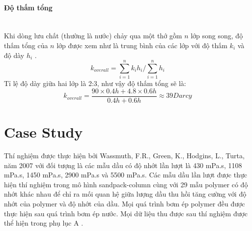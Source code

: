 \documentclass[12pt,a4paper]{article}
\newcommand{\subsubsubsection}[1]{\paragraph{#1}\mbox{}\\}
\begin{document}
	\subsubsubsection{Độ thấm tổng}
	Khi dòng lưu chất (thường là nước) chảy qua một thớ gồm $n$ lớp song song, độ thấm tổng của $n$ lớp được xem như là trung bình của các lớp với độ thấm $k_i$ và độ dày $h_i$ \cite{li2011study}.
		\begin{equation}
			k_{overall}=\sum_{i=1}^nk_ih_i/\sum_{i=1}^nh_i
		\end{equation}
	Tỉ lệ độ dày giữa hai lớp là 2:3, như vậy độ thấm tổng sẽ là:
		\begin{equation}
			k_{overall}=\frac{90\times0.4h+4.8\times0.6h}{0.4h+0.6h}\approx39 Darcy
		\end{equation}

\newpage
\section{Case Study}
	Thí nghiệm được thực hiện bởi Wassmuth, F.R., Green, K., Hodgins, L., Turta, năm 2007 \cite{wassmuth2007polymer} với đối tượng là các mẫu dầu có độ nhớt lần lượt là 430 mPa.s, 1108 mPa.s, 1450 mPa.s, 2900 mPa.s và 5500 mPa.s. Các mẫu dầu lần lượt được thực hiện thí nghiệm trong mô hình sandpack-column cùng với 29 mẫu polymer có độ nhớt khác nhau để chỉ ra mối quan hệ giữa lượng dầu thu hồi tăng cường với độ nhớt của polymer và độ nhớt của dầu. Mọi quá trình bơm ép polymer đều được thực hiện sau quá trình bơm ép nước. Mọi dữ liệu thu được sau thí nghiệm được thể hiện trong phụ lục A \cite{wang2009optimum}.
\end{document}
